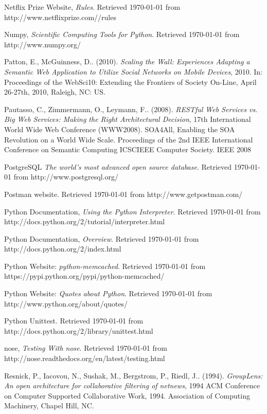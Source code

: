 \begin{thebibliography}{9}
     Netflix Prize Website, \emph{Rules}.  Retrieved \today{} from http://www.netflixprize.com//rules

     Numpy, \emph{Scientific Computing Tools for Python}. Retrieved \today{} from http://www.numpy.org/

     Patton, E., McGuinness, D.. (2010). \emph{Scaling the Wall: Experiences Adapting a Semantic Web Application to Utilize Social Networks on Mobile Devices}, 2010. In: Proceedings of the WebSci10: Extending the Frontiers of Society On-Line, April 26-27th, 2010, Raleigh, NC: US.

     Pautasso, C., Zimmermann, O., Leymann, F.. (2008). \emph{RESTful Web Services vs. Big Web Services: Making the Right Architectural Decision}, 17th International World Wide Web Conference (WWW2008). SOA4All, Enabling the SOA Revolution on a World Wide Scale. Proceedings of the 2nd IEEE International Conference on Semantic Computing ICSCIEEE Computer Society. IEEE 2008

     PostgreSQL \emph{The world's most advanced open source database}. Retrieved \today{} from http://www.postgresql.org/

     Postman website. Retrieved \today{} from http://www.getpostman.com/
    
     Python Documentation, \emph{Using the Python Interpreter}. Retrieved \today{} from http://docs.python.org/2/tutorial/interpreter.html

     Python Documentation, \emph{Overview}. Retrieved \today{} from http://docs.python.org/2/index.html

     Python Website: \emph{python-memcached}. Retrieved \today{} from https://pypi.python.org/pypi/python-memcached/

     Python Website: \emph{Quotes about Python}. Retrieved \today{} from http://www.python.org/about/quotes/

     Python Unittest. Retrieved \today{} from http://docs.python.org/2/library/unittest.html

     nose, \emph{Testing With nose}. Retrieved \today{} from http://nose.readthedocs.org/en/latest/testing.html

     Resnick, P., Iacovou, N., Sushak, M., Bergstrom, P., Riedl, J.. (1994). \emph{GroupLens: An open architecture for collaborative filtering of netnews}, 1994 ACM Conference on Computer Supported Collaborative Work, 1994. Association of Computing Machinery, Chapel Hill, NC.


\end{thebibliography}
